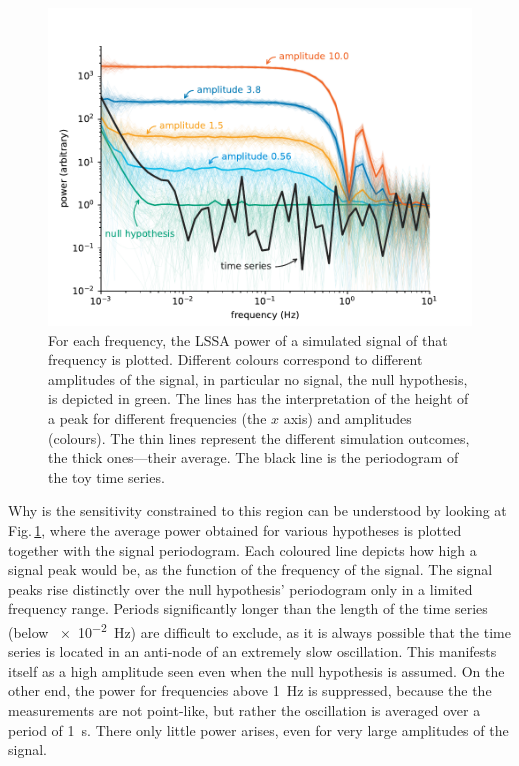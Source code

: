 \begin{figure}
  \centering \includegraphics[width=0.8\linewidth]{gfx/axions/basic_exclusion_sensitivity.pdf}
  \caption{For each frequency, the LSSA power of a simulated signal of that frequency is plotted. Different colours correspond to different amplitudes of the signal, in particular no signal, the null hypothesis, is depicted in green. The lines has the interpretation of the height of a peak for different frequencies (the $x$ axis) and amplitudes (colours). The thin lines represent the different simulation outcomes, the thick ones---their average. The black line is the periodogram of the toy time series.}
  \label{fig:sensitivity}
\end{figure}

Why is the sensitivity constrained to this region can be understood by looking at Fig.\,\ref{fig:sensitivity}, where the average power obtained for various hypotheses is plotted together with the signal periodogram. Each coloured line depicts how high a signal peak would be, as the function of the frequency of the signal.
The signal peaks rise distinctly over the null hypothesis' periodogram only in a limited frequency range. Periods significantly longer than the length of the time series (below \SI{e-2}{\hertz}) are difficult to exclude, as it is always possible that the time series is located in an anti-node of an extremely slow oscillation. This manifests itself as a high amplitude seen even when the null hypothesis is assumed. On the other end, the power for frequencies above \SI{1}{\hertz} is suppressed, because the the measurements are not point-like, but rather the oscillation is averaged over a period of \SI{1}{\second}. There only little power arises, even for very large amplitudes of the signal.

